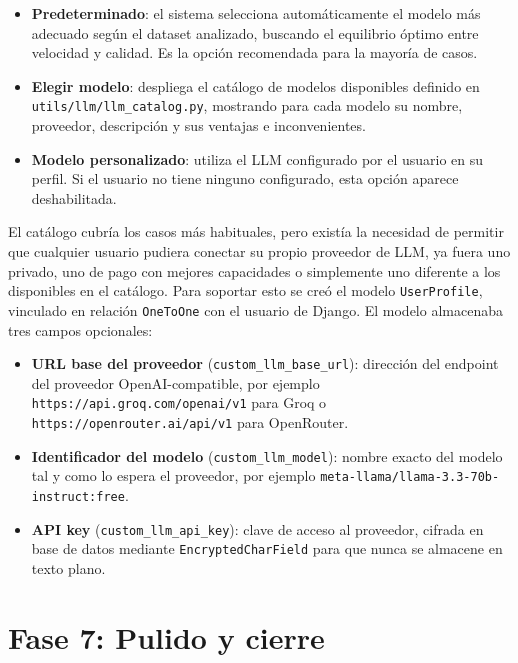 \begin{itemize}
    \item \textbf{Predeterminado}: el sistema selecciona automáticamente el 
    modelo más adecuado según el dataset analizado, buscando el equilibrio 
    óptimo entre velocidad y calidad. Es la opción recomendada para la 
    mayoría de casos.
    
    \item \textbf{Elegir modelo}: despliega el catálogo de modelos disponibles 
    definido en \\ \texttt{utils/llm/llm\_catalog.py}, mostrando para cada modelo 
    su nombre, proveedor, descripción y sus ventajas e inconvenientes.
    
    \item \textbf{Modelo personalizado}: utiliza el LLM configurado por el 
    usuario en su perfil. Si el usuario no tiene ninguno configurado, esta 
    opción aparece deshabilitada.
\end{itemize}

El catálogo cubría los casos más habituales, pero existía la necesidad de 
permitir que cualquier usuario pudiera conectar su propio proveedor de LLM, 
ya fuera uno privado, uno de pago con mejores capacidades o simplemente uno 
diferente a los disponibles en el catálogo. Para soportar esto se creó el 
modelo \texttt{UserProfile}, vinculado en relación \texttt{OneToOne} con el 
usuario de Django. El modelo almacenaba tres campos opcionales:

\begin{itemize}
    \item \textbf{URL base del proveedor} (\texttt{custom\_llm\_base\_url}): 
    dirección del endpoint del proveedor OpenAI-compatible, por ejemplo 
    \texttt{https://api.groq.com/openai/v1} para Groq o 
    \texttt{https://openrouter.ai/api/v1} para OpenRouter.
    
    \item \textbf{Identificador del modelo} (\texttt{custom\_llm\_model}): 
    nombre exacto del modelo tal y como lo espera el proveedor, por ejemplo 
    \texttt{meta-llama/llama-3.3-70b-instruct:free}.
    
    \item \textbf{API key} (\texttt{custom\_llm\_api\_key}): clave de acceso 
    al proveedor, cifrada en base de datos mediante \texttt{EncryptedCharField} 
    para que nunca se almacene en texto plano.
\end{itemize}


\section{Fase 7: Pulido y cierre}
\label{sec:pulido-cierre}

